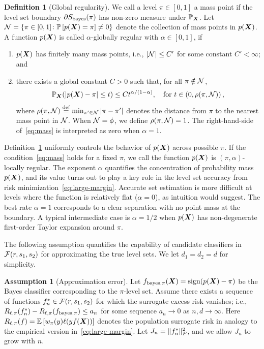 \documentclass[11pt]{article}
\theoremstyle{definition}
\newtheorem{assumption}{Assumption}
\newtheorem{defn}{Definition}
\def\sign{\textup{sign}}
\def\bayesS{S_{\textup{bayes}}}
\def\bayespif{f_{\textup{bayes},\pi}}
\begin{document}
\begin{defn} [Global regularity]\label{ass:decboundary}We call a level $\pi\in[0,1]$ a mass point if the level set boundary $\partial \bayesS(\pi)$ has non-zero measure under $\mathbb{P}_{\bm X}$. Let $\mathcal{N}=\{\pi\in[0,1] \colon \mathbb{P}\left[p(\bm X)=\pi\right]\neq 0\}$ denote the collection of mass points in $p(\bm X)$. A function $p(\bm X)$ is called $\alpha$-globally regular with $\alpha\in[0,1]$, if 
\begin{enumerate}[label=(\roman*),wide, labelwidth=!, labelindent=0pt,topsep=-5pt,itemsep=-1ex,partopsep=0ex,parsep=1ex]
\item $p(\bm X)$ has finitely many mass points, i.e., $|\mathcal{N}|\leq C'$ for some constant $C'<\infty$; and 
\item 
there exists a global constant $C>0$ such that, for all $\pi \notin \mathcal{N} $,
\begin{equation}\label{eq:mass}
\mathbb{P}_{\bm X}(|p(\bm X)-\pi|\leq t)\leq Ct^{\alpha/(1-\alpha)}, \quad \text{for }t\in \left(0,\rho(\pi,\mathcal{N})\right),
\end{equation}
where $\rho(\pi,\mathcal{N})\stackrel{\text{def}}{=}\min_{\pi'\in \mathcal{N}} |\pi-\pi'|$  denotes the distance from $\pi$ to the nearest mass point in $\mathcal{N}$. When $\mathcal{N} = \phi$, we define $\rho(\pi,\mathcal{N})=1$. The right-hand-side of~\eqref{eq:mass} is interpreted as zero when $\alpha=1$.
\end{enumerate}
\end{defn}

Definition~\ref{ass:decboundary} uniformly controls the behavior of $p(\bm X)$ across possible $\pi$. If the condition~\eqref{eq:mass} holds for a fixed $\pi$, we call the function $p(\bm X)$ is $(\pi,\alpha)$-locally regular. The exponent $\alpha$ quantifies the concentration of probability mass $p(\bm X)$, and its value turns out to play a key role in the level set accuracy from risk minimization~\eqref{eq:large-margin}. Accurate set estimation is more difficult at levels where the function is relatively flat ($\alpha = 0$), as intuition would suggest. The best rate $\alpha=1$ corresponds to a clear separation with no point mass at the boundary. A typical intermediate case is $\alpha=1/2$ when $p(\bm X)$ has non-degenerate first-order Taylor expansion around $\pi$. 

The following assumption quantifies the capability of candidate classifiers in $\mathcal{F}(r,s_1,s_2)$ for approximating the true level sets. We let $d_1=d_2=d$ for simplicity. 

\begin{assumption}[Approximation error]\label{ass:main} 
Let $f_{\text{bayes},\pi}(\mX)=\sign(p(\mX) -\pi)$ be the Bayes classifier corresponding to the $\pi$-level set. Assume there exists a sequence of functions $f_n^*\in\mathcal{F}(r,s_1,s_2)$ for which the surrogate excess risk vanishes; i.e., $R_{\ell,\pi}(f^*_n)-R_{\ell,\pi}(\bayespif)\leq a_n$ for some sequence $a_n\to 0$ as $n,d\to \infty$. Here $R_{\ell,\pi}(f)=\mathbb{E}\left[w_\pi(y)\ell(yf(\bm X))\right]$ denotes the population surrogate risk in analogy to the empirical version in~\eqref{eq:large-margin}. Let $J_n=\lVert f^*_n\rVert_F^2$, and we allow $J_n$ to grow with $n$. 
\end{assumption}
\end{document}
